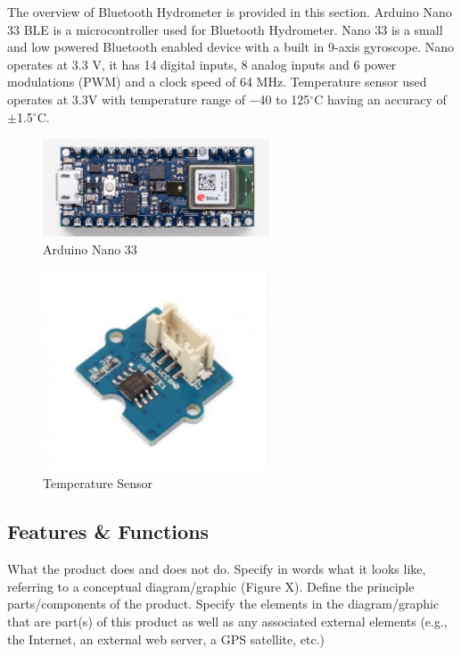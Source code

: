 The overview of Bluetooth Hydrometer is provided in this section. Arduino Nano 33 BLE is a microcontroller used for Bluetooth Hydrometer. Nano 33 is a small and low powered Bluetooth enabled device with a built in 9-axis gyroscope. Nano operates at 3.3 V, it has 14 digital inputs, 8 analog inputs and 6 power modulations (PWM) and a clock speed of 64 MHz. Temperature sensor used operates at 3.3V with temperature range of $-$40 to 125$^\circ$C having an accuracy of  $\pm$1.5$^\circ$C.

\begin{figure}[h!]
	\centering
   	\includegraphics[width=0.60\textwidth]{images/arduino_nano_33}
    \caption{Arduino Nano 33}
\end{figure}
\begin{figure}[h!]
	\centering
   	\includegraphics[width=0.60\textwidth]{images/temperature_sensor}
    \caption{Temperature Sensor}
\end{figure}

\subsection{Features \& Functions}
What the product does and does not do. Specify in words what it looks like, referring to a conceptual diagram/graphic (Figure X).  Define the principle parts/components of the product. Specify the elements in the diagram/graphic that are part(s) of this product as well as any associated external elements (e.g., the Internet, an external web server, a GPS satellite, etc.)

